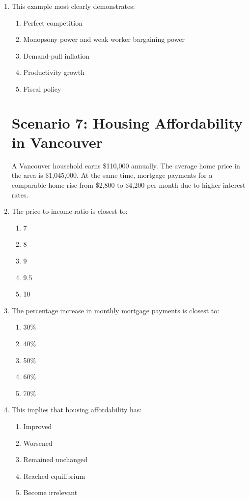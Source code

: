 \documentclass[12pt]{article}
\begin{document}
\begin{enumerate}[label=\textbf{\arabic*.}]
\item This example most clearly demonstrates:
\begin{enumerate}[label=\Alph*.]
\item Perfect competition
\item Monopsony power and weak worker bargaining power
\item Demand-pull inflation
\item Productivity growth
\item Fiscal policy
\end{enumerate}

\section*{Scenario 7: Housing Affordability in Vancouver}

A Vancouver household earns \$110,000 annually. The average home price in the area is \$1,045,000. At the same time, mortgage payments for a comparable home rise from \$2,800 to \$4,200 per month due to higher interest rates.
\newpage
\item The price-to-income ratio is closest to:
\begin{enumerate}[label=\Alph*.]
\item 7
\item 8
\item 9
\item 9.5
\item 10
\end{enumerate}

\item The percentage increase in monthly mortgage payments is closest to:
\begin{enumerate}[label=\Alph*.]
\item 30\%
\item 40\%
\item 50\%
\item 60\%
\item 70\%
\end{enumerate}

\item This implies that housing affordability has:
\begin{enumerate}[label=\Alph*.]
\item Improved
\item Worsened
\item Remained unchanged
\item Reached equilibrium
\item Become irrelevant
\end{enumerate}


\end{enumerate}
\end{document}
